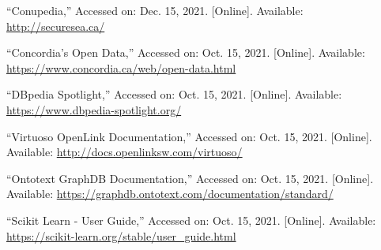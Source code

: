 \documentclass[conference]{IEEEtran}
\begin{document}
\begin{thebibliography}{00}
     ``Conupedia,'' Accessed on: Dec. 15, 2021. [Online]. Available: \url{http://securesea.ca/}
    
     ``Concordia's Open Data,'' Accessed on: Oct. 15, 2021. [Online]. Available: \url{https://www.concordia.ca/web/open-data.html}
    
      ``DBpedia Spotlight,'' Accessed on: Oct. 15, 2021. [Online]. Available: \url{https://www.dbpedia-spotlight.org/}
    
      ``Virtuoso OpenLink Documentation,'' Accessed on: Oct. 15, 2021. [Online]. Available: \url{http://docs.openlinksw.com/virtuoso/}
    
      ``Ontotext GraphDB Documentation,'' Accessed on: Oct. 15, 2021. [Online]. Available: \url{https://graphdb.ontotext.com/documentation/standard/}
    
      ``Scikit Learn - User Guide,'' Accessed on: Oct. 15, 2021. [Online]. Available: \url{https://scikit-learn.org/stable/user_guide.html}
\end{thebibliography}
\vspace{12pt}
\end{document}

